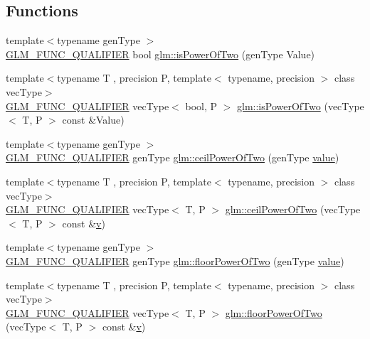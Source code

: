 \subsection*{Functions}
\begin{DoxyCompactItemize}
\item 
{\footnotesize template$<$typename gen\+Type $>$ }\\\mbox{\hyperlink{setup_8hpp_a33fdea6f91c5f834105f7415e2a64407}{G\+L\+M\+\_\+\+F\+U\+N\+C\+\_\+\+Q\+U\+A\+L\+I\+F\+I\+ER}} bool \mbox{\hyperlink{namespaceglm_a2e60d24d864637d3ebd62e6fa4941613}{glm\+::is\+Power\+Of\+Two}} (gen\+Type Value)
\item 
{\footnotesize template$<$typename T , precision P, template$<$ typename, precision $>$ class vec\+Type$>$ }\\\mbox{\hyperlink{setup_8hpp_a33fdea6f91c5f834105f7415e2a64407}{G\+L\+M\+\_\+\+F\+U\+N\+C\+\_\+\+Q\+U\+A\+L\+I\+F\+I\+ER}} vec\+Type$<$ bool, P $>$ \mbox{\hyperlink{group__gtc__round_gad454e4c8d8cd73ddc7de855f733a1465}{glm\+::is\+Power\+Of\+Two}} (vec\+Type$<$ T, P $>$ const \&Value)
\item 
{\footnotesize template$<$typename gen\+Type $>$ }\\\mbox{\hyperlink{setup_8hpp_a33fdea6f91c5f834105f7415e2a64407}{G\+L\+M\+\_\+\+F\+U\+N\+C\+\_\+\+Q\+U\+A\+L\+I\+F\+I\+ER}} gen\+Type \mbox{\hyperlink{namespaceglm_a15ad0f1b70561471f34bc2e43469424e}{glm\+::ceil\+Power\+Of\+Two}} (gen\+Type \mbox{\hyperlink{glad_8h_a03aff08f73d7fde3d1a08e0abd8e84fa}{value}})
\item 
{\footnotesize template$<$typename T , precision P, template$<$ typename, precision $>$ class vec\+Type$>$ }\\\mbox{\hyperlink{setup_8hpp_a33fdea6f91c5f834105f7415e2a64407}{G\+L\+M\+\_\+\+F\+U\+N\+C\+\_\+\+Q\+U\+A\+L\+I\+F\+I\+ER}} vec\+Type$<$ T, P $>$ \mbox{\hyperlink{group__gtc__round_ga76ec9b214ea1376fe09a903e34bab847}{glm\+::ceil\+Power\+Of\+Two}} (vec\+Type$<$ T, P $>$ const \&\mbox{\hyperlink{glad_8h_a14cfbe2fc2234f5504618905b69d1e06}{v}})
\item 
{\footnotesize template$<$typename gen\+Type $>$ }\\\mbox{\hyperlink{setup_8hpp_a33fdea6f91c5f834105f7415e2a64407}{G\+L\+M\+\_\+\+F\+U\+N\+C\+\_\+\+Q\+U\+A\+L\+I\+F\+I\+ER}} gen\+Type \mbox{\hyperlink{namespaceglm_ac1385510b859757901e927c43bf4f329}{glm\+::floor\+Power\+Of\+Two}} (gen\+Type \mbox{\hyperlink{glad_8h_a03aff08f73d7fde3d1a08e0abd8e84fa}{value}})
\item 
{\footnotesize template$<$typename T , precision P, template$<$ typename, precision $>$ class vec\+Type$>$ }\\\mbox{\hyperlink{setup_8hpp_a33fdea6f91c5f834105f7415e2a64407}{G\+L\+M\+\_\+\+F\+U\+N\+C\+\_\+\+Q\+U\+A\+L\+I\+F\+I\+ER}} vec\+Type$<$ T, P $>$ \mbox{\hyperlink{group__gtc__round_ga6a5a8f6dd1b2f755e4572bd039062c37}{glm\+::floor\+Power\+Of\+Two}} (vec\+Type$<$ T, P $>$ const \&\mbox{\hyperlink{glad_8h_a14cfbe2fc2234f5504618905b69d1e06}{v}})

\end{DoxyCompactItemize}
